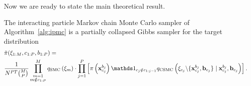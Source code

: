 
Now we are ready to state the main theoretical result.
\begin{theorem}
	\label{thm:one}
	The interacting particle Markov chain Monte Carlo sampler of Algorithm~\ref{alg:ipmc} is a partially collapsed Gibbs sampler \citep{van2008partially} for the target distribution
	\begin{align}
	\label{eq:targetdistribution}
	&\tilde \pi(\xib_{1:M}, c_{1:P}, b_{1:P}) =  \nonumber \\
	&\frac{1}{N^{PT} \binom{M}{P}} \prod_{\substack{m=1\\m\notin c_{1:P}}}^M q_{\text{SMC}}\left(\xib_m\right) \cdot \prod_{j = 1}^P \left[ \pi\left(\xb_{c_j}^{b_j}\right) \iden_{c_j \notin c_{1:j-1}} 
	q_{\text{CSMC}}\left(\xib_{c_j} \backslash \{\xb_{c_j}^{b_j}, \bb_{c_j}\} \mid \xb_{c_j}^{b_j}, \bb_{c_j}\right) \right].
	\end{align}
\end{theorem}
